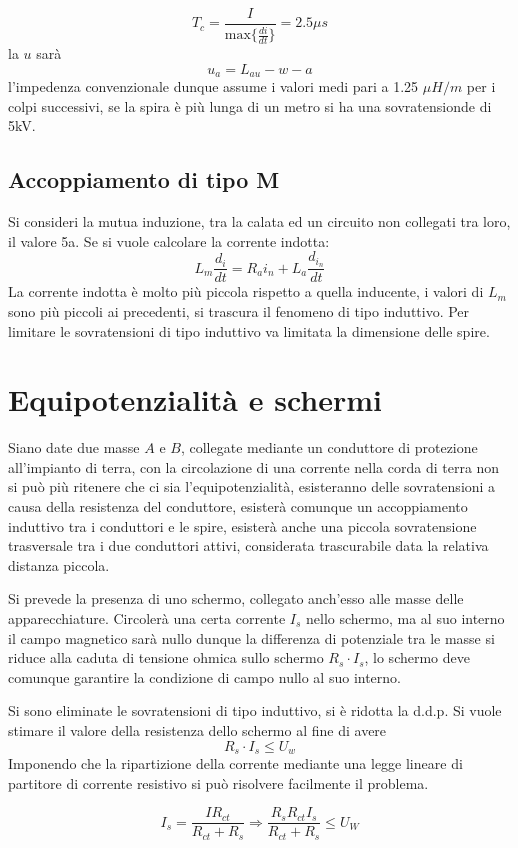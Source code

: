 $$
T_c = \frac{I}{\text{max}\{ \frac{di}{dt} \}} = 2.5\mu s
$$
la $u$ sarà 
$$
u_a = L_{au} -w-a
$$
l'impedenza convenzionale dunque assume i valori medi pari a 1.25 $\mu H/m$
 per i colpi successivi, se la spira è più lunga di un metro si ha una sovratensionde di 5kV.

 \subsection{Accoppiamento di tipo M}
Si consideri la mutua induzione, tra la calata ed un circuito non collegati tra loro, il valore 5a. Se si vuole calcolare la corrente indotta:
$$
L_m \frac{d_{i}}{dt} = R_a i_n + L_a\frac{d_{i_n}}{dt}
$$
La corrente indotta è molto più piccola rispetto a quella inducente, i valori di $L_m$ sono più piccoli ai precedenti, si trascura il fenomeno di tipo induttivo.
Per limitare le sovratensioni di tipo induttivo va limitata la dimensione delle spire.


\section{Equipotenzialità e schermi}
Siano date due masse $A$ e $B$, collegate mediante un conduttore di protezione 
all'impianto di terra, con la circolazione di una corrente nella corda di terra 
non si può più ritenere che ci sia l'equipotenzialità, esisteranno delle 
sovratensioni a causa della resistenza del conduttore, esisterà comunque un 
accoppiamento induttivo tra i conduttori e le spire, esisterà anche una piccola 
sovratensione trasversale tra i due conduttori attivi, considerata trascurabile 
data la relativa distanza piccola.

Si prevede la presenza di uno schermo, collegato anch'esso alle masse delle 
apparecchiature. Circolerà una certa corrente $I_s$ nello schermo, ma al suo 
interno il campo magnetico sarà nullo dunque la differenza di potenziale tra le 
masse si riduce alla caduta di tensione ohmica sullo schermo $R_s\cdot I_s$, lo 
schermo deve comunque garantire la condizione di campo nullo al suo interno.

Si sono eliminate le sovratensioni di tipo induttivo, si è ridotta la d.d.p.
Si vuole stimare il valore della resistenza dello schermo al fine di avere
$$
R_s\cdot I_s \leq U_w
$$
Imponendo che la ripartizione della corrente mediante una legge lineare di partitore di corrente resistivo si può risolvere facilmente il problema.

$$
I_s = \frac{IR_{ct}}{R_{ct}+R_s} \Rightarrow \frac{R_sR_{ct}I_s}{R_{ct}+R_s} \leq U_W
$$

